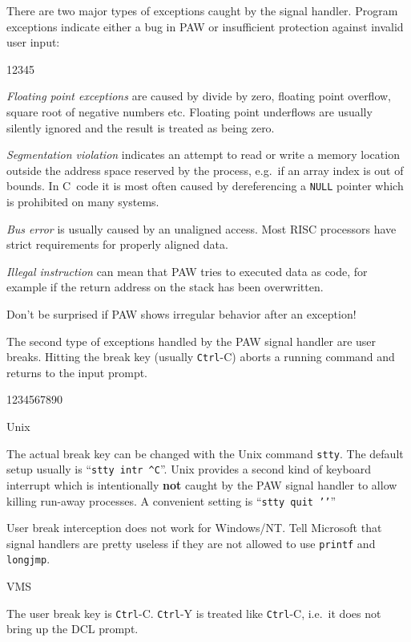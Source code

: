 There are two major types of exceptions caught by the signal handler.
Program exceptions indicate either a bug in PAW
or insufficient protection against invalid user input:
\begin{DL}{12345}
\item[\emph{Floating point exceptions }]
are caused by divide by zero, floating point overflow, square root of negative
numbers etc.
Floating point underflows are usually silently ignored and the result
is treated as being zero.
\item[\emph{Segmentation violation }]
indicates an attempt to read or write a memory location outside the
address space reserved by the process, e.g.\ if an array index is out
of bounds.
In C~code it is most often caused by dereferencing a \texttt{NULL}
pointer which is prohibited on many systems.
\item[\emph{Bus error }]
is usually caused by an unaligned access.
Most RISC processors have strict requirements for properly aligned data.
\item[\emph{Illegal instruction }]
can mean that PAW tries to executed data as code, for example
if the return address on the stack has been overwritten.
\end{DL}
Don't be surprised if PAW shows irregular behavior after an exception!

The second type of exceptions handled by the PAW signal handler
are user breaks.
Hitting the break key (usually \texttt{Ctrl}-C) aborts a running command
and returns to the input prompt.

\begin{DL}{1234567890}
\item[Unix]

The actual break key can be changed with the Unix command \texttt{stty}.
The default setup usually is ``\verb!stty intr ^C!''.
Unix provides a second kind of keyboard interrupt which is intentionally
\textbf{not} caught by the PAW signal handler to allow killing
run-away processes.
A convenient setting is ``\texttt{stty quit '\bs\bs'}''

User break interception does not work for Windows/NT.
Tell Microsoft that signal handlers are pretty useless if they are not
allowed to use \texttt{printf} and \texttt{longjmp}.


\item[VMS]

The user break key is \texttt{Ctrl}-C.
\texttt{Ctrl}-Y is treated like \texttt{Ctrl}-C, i.e.\ it does not bring up
the DCL prompt.

\end{DL}


